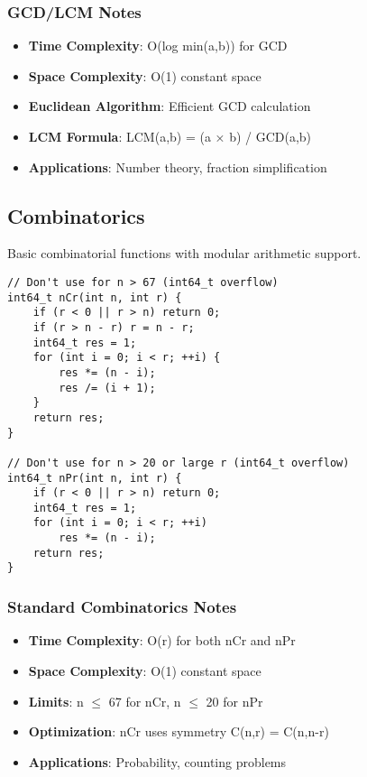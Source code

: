 \documentclass[11pt,a4paper]{article}
\begin{document}
\subsubsection{GCD/LCM Notes}
\begin{itemize}
\item \textbf{Time Complexity}: O(log min(a,b)) for GCD
\item \textbf{Space Complexity}: O(1) constant space
\item \textbf{Euclidean Algorithm}: Efficient GCD calculation
\item \textbf{LCM Formula}: LCM(a,b) = (a × b) / GCD(a,b)
\item \textbf{Applications}: Number theory, fraction simplification
\end{itemize}

\newpage
\subsection{Combinatorics}
Basic combinatorial functions with modular arithmetic support.

\begin{lstlisting}[caption={Standard nCr and nPr}]
// Don't use for n > 67 (int64_t overflow)
int64_t nCr(int n, int r) {
    if (r < 0 || r > n) return 0;
    if (r > n - r) r = n - r;
    int64_t res = 1;
    for (int i = 0; i < r; ++i) {
        res *= (n - i);
        res /= (i + 1);
    }
    return res;
}

// Don't use for n > 20 or large r (int64_t overflow)
int64_t nPr(int n, int r) {
    if (r < 0 || r > n) return 0;
    int64_t res = 1;
    for (int i = 0; i < r; ++i)
        res *= (n - i);
    return res;
}
\end{lstlisting}

\subsubsection{Standard Combinatorics Notes}
\begin{itemize}
\item \textbf{Time Complexity}: O(r) for both nCr and nPr
\item \textbf{Space Complexity}: O(1) constant space
\item \textbf{Limits}: n $\leq$ 67 for nCr, n $\leq$ 20 for nPr
\item \textbf{Optimization}: nCr uses symmetry C(n,r) = C(n,n-r)
\item \textbf{Applications}: Probability, counting problems
\end{itemize}
\end{document}
